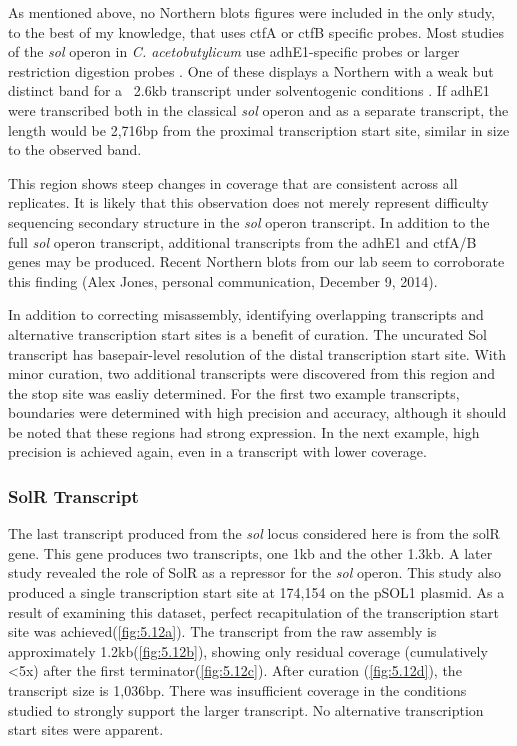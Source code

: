 As mentioned above, no Northern blots figures were included in the only study, to the best of my knowledge, that uses ctfA or ctfB specific probes\cite{65}. Most studies of the \textit{sol} operon in \textit{C. acetobutylicum} use adhE1-specific probes or larger restriction digestion probes \cite{63,68,71}. One of these displays a Northern with a weak but distinct band for a ~2.6kb transcript under solventogenic conditions \cite{69}. If adhE1 were transcribed both in the classical \textit{sol} operon and as a separate transcript, the length would be 2,716bp from the proximal transcription start site, similar in size to the observed band\cite{69}. 

This region shows steep changes in coverage that are consistent across all replicates. It is likely that this observation does not merely represent difficulty sequencing secondary structure in the \textit{sol} operon transcript. In addition to the full \textit{sol} operon transcript, additional transcripts from the adhE1 and ctfA/B genes may be produced. Recent Northern blots from our lab seem to corroborate this finding (Alex Jones, personal communication, December 9, 2014).

In addition to correcting misassembly, identifying overlapping transcripts and alternative transcription start sites is a benefit of curation. The uncurated Sol transcript has basepair-level resolution of the distal transcription start site. With minor curation, two additional transcripts were discovered from this region and the stop site was easliy determined. For the first two example transcripts, boundaries were determined with high precision and accuracy, although it should be noted that these regions had strong expression. In the next example, high precision is achieved again, even in a transcript with lower coverage.


\subsubsection{SolR Transcript}
The last transcript produced from the \textit{sol} locus considered here is from the solR gene. This gene produces two transcripts, one 1kb and the other 1.3kb\cite{63}. A later study revealed the role of SolR as a repressor for the \textit{sol} operon\cite{69}. This study also produced a single transcription start site at 174,154 on the pSOL1 plasmid. As a result of examining this dataset, perfect recapitulation of the transcription start site was achieved(\ref{fig:5.12a}). The transcript from the raw assembly is approximately 1.2kb(\ref{fig:5.12b}), showing only residual coverage (cumulatively \textless 5x) after the first terminator(\ref{fig:5.12c}). After curation (\ref{fig:5.12d}), the transcript size is 1,036bp. There was insufficient coverage in the conditions studied to strongly support the larger transcript. No alternative transcription start sites were apparent.

